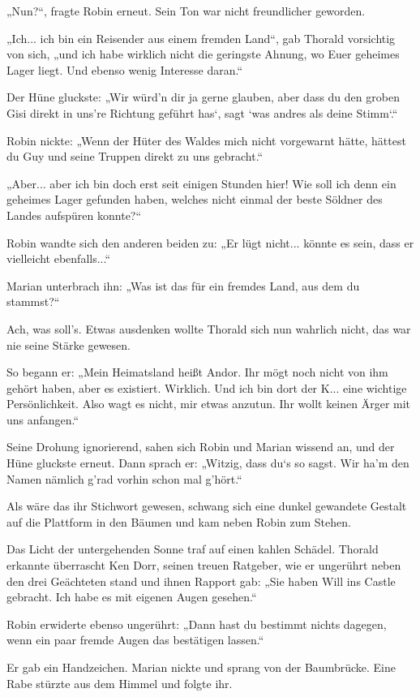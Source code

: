 „Nun?“, fragte Robin erneut. Sein Ton war nicht freundlicher geworden.

„Ich... ich bin ein Reisender aus einem fremden Land“, gab Thorald vorsichtig von sich, „und ich habe wirklich nicht die geringste Ahnung, wo Euer geheimes Lager liegt. Und ebenso wenig Interesse daran.“

Der Hüne gluckste: „Wir würd’n dir ja gerne glauben, aber dass du den groben Gisi direkt in uns’re Richtung geführt has‘, sagt ‘was andres als deine Stimm‘.“

Robin nickte: „Wenn der Hüter des Waldes mich nicht vorgewarnt hätte, hättest du Guy und seine Truppen direkt zu uns gebracht.“

„Aber... aber ich bin doch erst seit einigen Stunden hier! Wie soll ich denn ein geheimes Lager gefunden haben, welches nicht einmal der beste Söldner des Landes aufspüren konnte?“

Robin wandte sich den anderen beiden zu: „Er lügt nicht... könnte es sein, dass er vielleicht ebenfalls...“

Marian unterbrach ihn: „Was ist das für ein fremdes Land, aus dem du stammst?“

Ach, was soll’s. Etwas ausdenken wollte Thorald sich nun wahrlich nicht, das war nie seine Stärke gewesen.

So begann er: „Mein Heimatsland heißt Andor. Ihr mögt noch nicht von ihm gehört haben, aber es existiert. Wirklich. Und ich bin dort der K... eine wichtige Persönlichkeit. Also wagt es nicht, mir etwas anzutun. Ihr wollt keinen Ärger mit uns anfangen.“

Seine Drohung ignorierend, sahen sich Robin und Marian wissend an, und der Hüne gluckste erneut. Dann sprach er: „Witzig, dass du‘s so sagst. Wir ha’m den Namen nämlich g’rad vorhin schon mal g’hört.“

Als wäre das ihr Stichwort gewesen, schwang sich eine dunkel gewandete Gestalt auf die Plattform in den Bäumen und kam neben Robin zum Stehen.

Das Licht der untergehenden Sonne traf auf einen kahlen Schädel. Thorald erkannte überrascht Ken Dorr, seinen treuen Ratgeber, wie er ungerührt neben den drei Geächteten stand und ihnen Rapport gab: „Sie haben Will ins Castle gebracht. Ich habe es mit eigenen Augen gesehen.“

Robin erwiderte ebenso ungerührt: „Dann hast du bestimmt nichts dagegen, wenn ein paar fremde Augen das bestätigen lassen.“

Er gab ein Handzeichen. Marian nickte und sprang von der Baumbrücke. Eine Rabe stürzte aus dem Himmel und folgte ihr.

